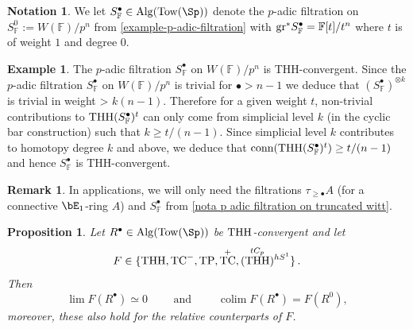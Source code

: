 \documentclass[english,10pt]{amsart}
\newcommand{\field}{\mathbb{F}}
\newtheorem{prop}{Proposition}[section]
\theoremstyle{definition}
\newtheorem{exam}{Example}[section]
\newtheorem{nota}{Notation}[section]
\newtheorem{rema}{Remark}[section]
\numberwithin{equation}{section}
\newcommand{\ntc}{\mathrm{TC}^{-}}
\DeclareMathOperator{\tp}{\ensuremath{\textup{TP}}}
\DeclareMathOperator{\tc}{\ensuremath{\textup{TC}}}
\DeclareMathOperator{\thh}{\ensuremath{\textup{THH}}}
\DeclareMathOperator*{\colim}{colim}
\newcommand{\Tow}{\mathrm{Tow}}
\newcommand{\Alg}{\mathrm{Alg}}
\newcommand{\wtw}{\tau_{\geq \bullet}}
\newcommand{\gr}{\textup{gr}^*}
\begin{document}
\begin{nota}\label{nota  p adic filtration on truncated witt}
We let $S_{\field}^{\bullet} \in \Alg(\Tow(\Sp))$ denote the $p$-adic filtration on $S_{\field}^0 := W(\field)/p^n$ from \autoref{example-p-adic-filtration} with $\gr S_{\field}^\bullet = \field[t]/t^n$ where $t$ is of weight $1$ and degree $0$. 
\end{nota}


\begin{exam}\label{exam p adic filtration is thh convergent}
The $p$-adic filtration $S_{\field}^{\bullet}$ on $W(\field)/p^n$ is THH-convergent. Since the $p$-adic filtration $S_{\field}^{\bullet}$ on $W(\field)/p^n$ is trivial for $\bullet> n-1$ we deduce that $(S_{\field}^{\bullet})^{\otimes k}$ is trivial in weight > $k(n-1)$. Therefore for a given weight $t$, non-trivial contributions to $\thh(S_{\field}^{\bullet})^t$ can only come from simplicial level $k$ (in the cyclic bar construction) such that $k\geq t/(n-1)$. Since simplicial level $k$ contributes to homotopy degree $k$ and above, we deduce that $\textup{conn}(\thh(S_{\field}^{\bullet})^t) \geq t/(n-1)$ and hence $S_{\field}^{\bullet}$ is THH-convergent.  
\end{exam}

\begin{rema}
In applications, we will only need the filtrations $\wtw A$ (for a connective $\bE_1$-ring $A$) and  $S_{\field}^{\bullet}$ from \autoref{nota  p adic filtration on truncated witt}. 
\end{rema}



\begin{prop}\label{lemm conditional convergence of filtrations}
Let  $R^{\bullet}\in \Alg(\Tow(\Sp))$ be $\thh$-convergent  and let 
  \[
   F\in \{\thh,\ntc,\tp,\tc^+,(\thh^{tC_p})^{hS^1}\} \,. \] 
 Then  
  \[ \lim F(R^{\bullet})\simeq 0 \qquad \text{ and } 
   \qquad \colim F(R^\bullet) = F(R^0), \]
    moreover,  these also hold for the relative counterparts of $F$. 
\end{prop}
\end{document}
